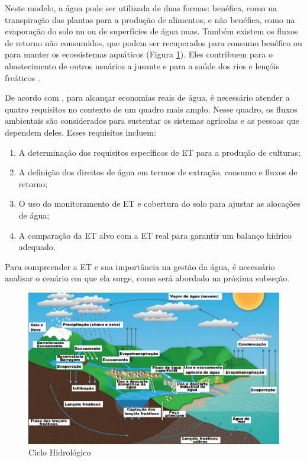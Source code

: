 Neste modelo, a água pode ser utilizada de duas formas: benéfica, como na transpiração das plantas para a produção de alimentos, e não benéfica, como na evaporação do solo nu ou de superfícies de água nuas. Também existem os fluxos de retorno não consumidos, que podem ser recuperados para consumo benéfico ou para manter os ecossistemas aquáticos (Figura \ref{figura:ciclo_agua}). Eles contribuem para o abastecimento de outros usuários a jusante e para a saúde dos rios e lençóis freáticos \parencite{carmody_fao2023}.

De acordo com \textcite{carmody_fao2023}, para alcançar economias reais de água, é necessário atender a quatro requisitos no contexto de um quadro mais amplo. Nesse quadro, os fluxos ambientais são considerados para sustentar os sistemas agrícolas e as pessoas que dependem deles. Esses requisitos incluem:

\begin{enumerate}
\item A determinação dos requisitos específicos de ET para a produção de culturas;
\item A definição dos direitos de água em termos de extração, consumo e fluxos de retorno;
\item O uso do monitoramento de ET e cobertura do solo para ajustar as alocações de água;
\item A comparação da ET alvo com a ET real para garantir um balanço hídrico adequado.
\end{enumerate}

Para compreender a ET e sua importância na gestão da água, é necessário analisar o cenário em que ela surge, como será abordado na próxima subseção.

\begin{figure}[!htb] \centering
  \caption{Ciclo Hidrológico} \label{figura:ciclo_agua}
  \begin{varwidth}{\linewidth}
    \includegraphics[width=16cm]{figuras/Carmody.png}
  \end{varwidth}
\end{figure}

